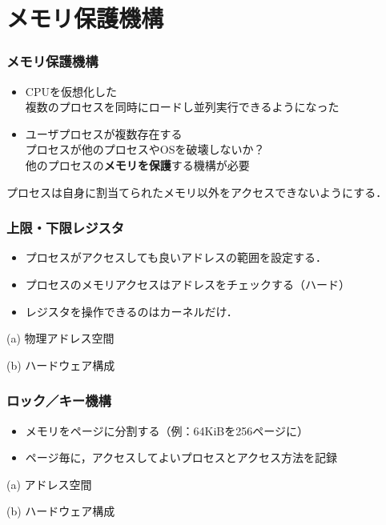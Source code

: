\documentclass[unicode]{beamer}                   %
\begin{document}
\section{メモリ保護機構}
\begin{frame}
  \frametitle{メモリ保護機構}
  \begin{itemize}
    \item CPUを仮想化した\\
      複数のプロセスを同時にロードし並列実行できるようになった
    \item ユーザプロセスが複数存在する \\
      プロセスが他のプロセスやOSを破壊しないか？\\
      他のプロセスの{\bf メモリを保護}する機構が必要
  \end{itemize}
  プロセスは自身に割当てられたメモリ以外をアクセスできないようにする．
\end{frame}

\begin{frame}
  \frametitle{上限・下限レジスタ}
  \begin{itemize}
    \item プロセスがアクセスしても良いアドレスの範囲を設定する．
    \item プロセスのメモリアクセスはアドレスをチェックする（ハード）
    \item レジスタを操作できるのはカーネルだけ．
  \end{itemize}
  \begin{minipage}{0.49\columnwidth}
    \centerline{(a) 物理アドレス空間}
  \end{minipage}
  \begin{minipage}{0.49\columnwidth}
    \centerline{(b) ハードウェア構成}
  \end{minipage}
  \vfill
\end{frame}

\begin{frame}
  \frametitle{ロック／キー機構}
  \begin{itemize}
    \item メモリをページに分割する（例：64KiBを256ページに）
    \item ページ毎に，アクセスしてよいプロセスとアクセス方法を記録
  \end{itemize}
  \begin{minipage}{0.49\columnwidth}
    \centerline{(a) アドレス空間}
  \end{minipage}
  \begin{minipage}{0.49\columnwidth}
    \centerline{(b) ハードウェア構成}
  \end{minipage}
  \vfill
\end{frame}
\end{document}
